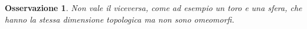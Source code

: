 \documentclass[10pt, twoside=false, x11names]{scrbook}
\newtheorem{osservation}[theorem]{Osservazione}
\newcommand{\me}{\mathrm{e}}
\begin{document}
\begin{osservation}
  Non vale il viceversa, come ad esempio un toro e una sfera, che hanno la stessa
  dimensione topologica ma non sono omeomorfi.
\end{osservation}





\printindex
\end{document}
